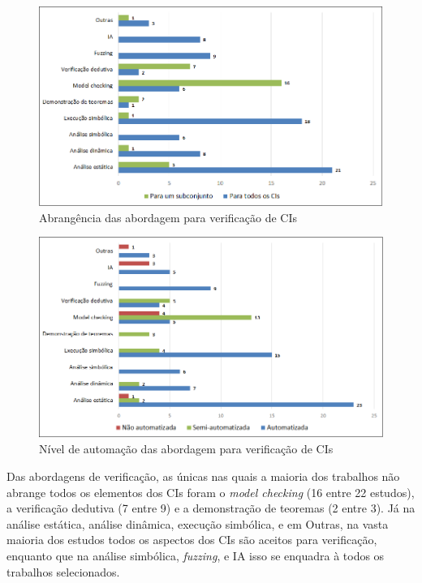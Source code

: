 \begin{figure}[!htb]
 \caption{Abrangência das abordagem para verificação de CIs}
 \label{fig:rq5-abrangencia}
 \centering
 \includegraphics[scale=0.6]{figuras/rq5-abrangencia.png}
 \fdadospesquisa
\end{figure}

\begin{figure}[!htb]
 \caption{Nível de automação das abordagem para verificação de CIs}
 \label{fig:rq5-automacao}
 \centering
 \includegraphics[scale=0.6]{figuras/rq5-automacao.png}
 \fdadospesquisa
\end{figure}





Das abordagens de verificação, as únicas nas quais a maioria dos trabalhos não abrange todos os elementos dos CIs foram o \textit{model checking} (16 entre 22 estudos), a verificação dedutiva (7 entre 9) e a demonstração de teoremas (2 entre 3). Já na análise estática, análise dinâmica, execução simbólica, e em Outras, na vasta maioria dos estudos todos os aspectos dos CIs são aceitos para verificação, enquanto que na análise simbólica, \textit{fuzzing}, e IA isso se enquadra à todos os trabalhos selecionados. 

